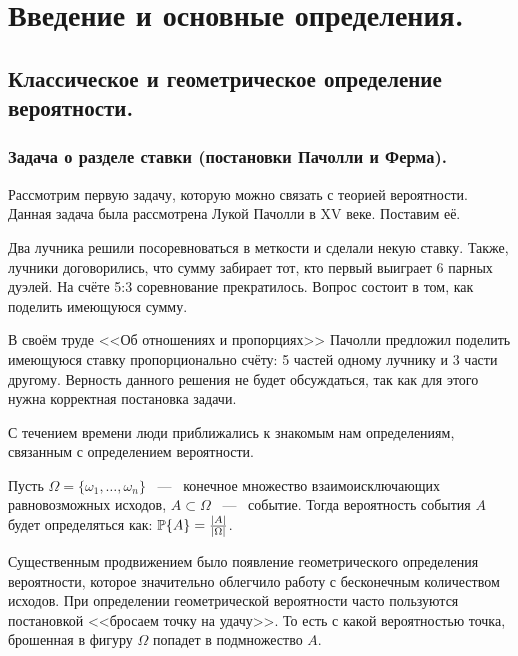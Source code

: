 \section{Введение и основные определения.}
\subsection{Классическое и геометрическое определение вероятности.}
\subsubsection{Задача о разделе ставки (постановки Пачолли и Ферма).}
\noindent Рассмотрим первую задачу, которую можно связать с теорией вероятности. Данная задача была рассмотрена Лукой Пачолли в XV веке. Поставим её. 

\begin{problem}
    Два лучника решили посоревноваться в меткости и сделали некую ставку. Также, лучники договорились, что сумму забирает тот, кто первый выиграет 6 парных дуэлей. На счёте 5:3 соревнование прекратилось. Вопрос состоит в том, как поделить имеющуюся сумму. 
\end{problem}

\noindent В своём труде <<Об отношениях и пропорциях>> Пачолли предложил поделить имеющуюся ставку пропорционально счёту: 5 частей одному лучнику и 3 части другому. Верность данного решения не будет обсуждаться, так как для этого нужна корректная постановка задачи. 

\noindent С течением времени люди приближались к знакомым нам определениям, связанным с определением вероятности. 

\begin{definition}[Классическое]
    Пусть $\Omega = \{\omega_1, \dots, \omega_n\}$ ~---~ конечное множество взаимоисключающих равновозможных исходов, $A \subset \Omega$ ~---~ событие. Тогда вероятность события $A$ будет определяться как: $\P\{A\} = \frac{|A|}{|\Omega|}$.
\end{definition}

\noindent Существенным продвижением было появление геометрического определения вероятности, которое значительно облегчило работу с бесконечным количеством исходов. При определении геометрической вероятности часто пользуются постановкой <<бросаем точку на удачу>>. То есть с какой вероятностью точка, брошенная в фигуру $\Omega$ попадет в подмножество $A$. 

